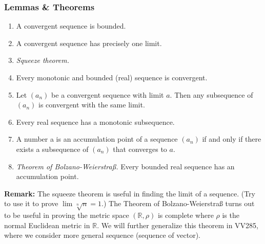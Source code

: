 \documentclass[10pt, t]{beamer}
\renewcommand{\emph}[1]{{\color{themecolor}\textsl{#1}}}
\newcommand{\R}{\mathbb{R}}
\begin{document}
\begin{frame}
    \frametitle{Lemmas \& Theorems}
    \begin{enumerate}
        \item A convergent sequence is bounded.
        \item A convergent sequence has precisely one limit.
        \item \emph{Squeeze theorem.}
        \item Every monotonic and bounded (real) sequence is convergent.
        \item Let $(a_n)$ be a convergent sequence with limit $a$. Then any
              subsequence of $(a_n)$ is convergent with the same limit.
        \item Every real sequence has a monotonic subsequence.
        \item  A number a is an accumulation point of a sequence $(a_n)$
              if and only if there exists a subsequence of $(a_n)$ that converges to $a$.
        \item \emph{Theorem of Bolzano-Weierstraß.} Every bounded real sequence has
              an accumulation point.
    \end{enumerate}
    \textbf{Remark:} The squeeze theorem is useful in finding the limit of a sequence. (Try to use it to prove $\lim \sqrt[n]{n}=1$.) The Theorem of  Bolzano-Weierstraß turns out to be useful in proving the metric space $(\R, \rho)$ is complete where $\rho$ is the normal Euclidean metric in $\R$. We will further generalize this theorem in VV285, where we consider more general sequence (sequence of vector).
\end{frame}
\end{document}

